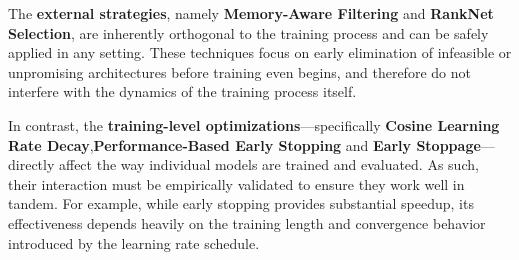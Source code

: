 The \textbf{external strategies}, namely \textbf{Memory-Aware Filtering} and \textbf{RankNet Selection}, are inherently orthogonal to the training process and can be safely applied in any setting. These techniques focus on early elimination of infeasible or unpromising architectures before training even begins, and therefore do not interfere with the dynamics of the training process itself.

In contrast, the \textbf{training-level optimizations}—specifically \textbf{Cosine Learning Rate Decay},\textbf{Performance-Based Early Stopping} and \textbf{Early Stoppage}—directly affect the way individual models are trained and evaluated. As such, their interaction must be empirically validated to ensure they work well in tandem. For example, while early stopping provides substantial speedup, its effectiveness depends heavily on the training length and convergence behavior introduced by the learning rate schedule.

